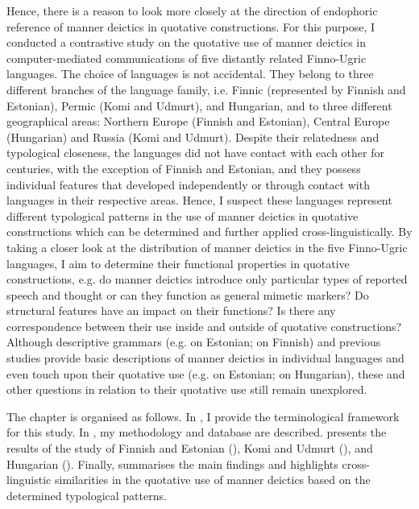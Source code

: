 \documentclass[output=paper,colorlinks,citecolor=brown]{langscibook}
\begin{document}
Hence, there is a reason to look more closely at the direction of endophoric reference of manner deictics in quotative constructions. For this purpose, I conducted a contrastive study on the quotative use of manner deictics in computer-mediated communications of five distantly related Finno-Ugric languages. The choice of languages is not accidental. They belong to three different branches of the language family, i.e. Finnic (represented by Finnish and Estonian), Permic (Komi and Udmurt), and Hungarian, and to three different geographical areas: Northern Europe (Finnish and Estonian), Central Europe (Hungarian) and Russia (Komi and Udmurt). Despite their relatedness and typological closeness, the languages did not have contact with each other for centuries, with the exception of Finnish and Estonian, and they possess individual features that developed independently or through contact with languages in their respective areas. Hence, I suspect these languages represent different typological patterns in the use of manner deictics in quotative constructions which can be determined and further applied cross-linguistically. By taking a closer look at the distribution of manner deictics in the five Finno-Ugric languages, I aim to determine their functional properties in quotative constructions, e.g. do manner deictics introduce only particular types of reported speech and thought or can they function as general mimetic markers? Do structural features have an impact on their functions? Is there any correspondence between their use inside and outside of quotative constructions? Although descriptive grammars (e.g. \citealt{EreltMetslang2017} on Estonian; \citealt{HakulinenEtAl2004} on Finnish) and previous studies provide basic descriptions of manner deictics in individual languages and even touch upon their quotative use (e.g. \citealt{Keevallik2005} on Estonian; \citealt{Kiefer2016} on Hungarian), these and other questions in relation to their quotative use still remain unexplored.

The chapter is organised as follows. In , I provide the terminological framework for this study. In , my methodology and database are described.  presents the results of the study of Finnish and Estonian (), Komi and Udmurt (), and Hungarian (). Finally,  summarises the main findings and highlights cross-linguistic similarities in the quotative use of manner deictics based on the determined typological patterns.
\end{document}
